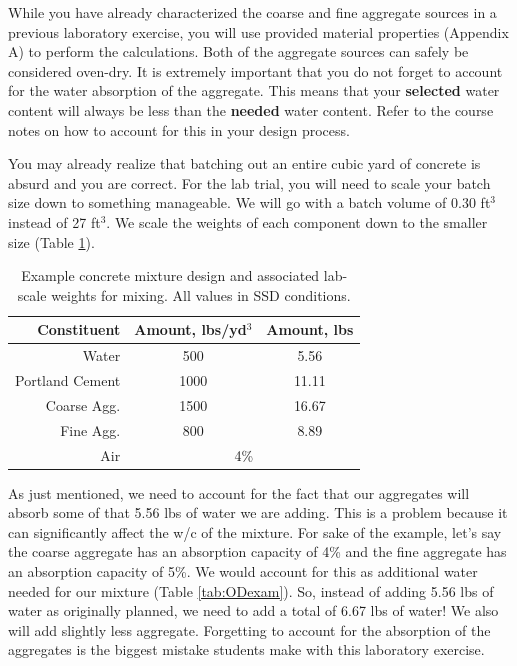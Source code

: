 \documentclass[12pt]{article}
\begin{document}
While you have already characterized the coarse and fine aggregate sources in a previous laboratory exercise, you will use provided material properties (Appendix A) to perform the calculations. Both of the aggregate sources can safely be considered oven-dry. It is extremely important that you do not forget to account for the water absorption of the aggregate. This means that your \textbf{selected} water content will always be less than the \textbf{needed} water content. Refer to the course notes on how to account for this in your design process.

You may already realize that batching out an entire cubic yard of concrete is absurd and you are correct. For the lab trial, you will need to scale your batch size down to something manageable. We will go with a batch volume of 0.30 ft$^3$ instead of 27 ft$^3$. We scale the weights of each component down to the smaller size (Table \ref{tab:SSDexam}).

\begin{table}[h]
\begin{center}
\caption{Example concrete mixture design and associated lab-scale weights for mixing. All values in SSD conditions.}
\label{tab:SSDexam}
\begin{tabular}{rcc}
\hline
Constituent     & \multicolumn{1}{l}{Amount, lbs/yd$^3$} & \multicolumn{1}{l}{Amount, lbs} \\ \hline
Water           & 500                                    & 5.56                            \\
Portland Cement & 1000                                   & 11.11                           \\
Coarse Agg.     & 1500                                   & 16.67                           \\
Fine Agg.       & 800                                    & 8.89                            \\
Air             & \multicolumn{2}{c}{4\%}                                                  \\ \hline
\end{tabular}
\end{center}
\end{table}

As just mentioned, we need to account for the fact that our aggregates will absorb some of that 5.56 lbs of water we are adding. This is a problem because it can significantly affect the w/c of the mixture. For sake of the example, let's say the coarse aggregate has an absorption capacity of 4\% and the fine aggregate has an absorption capacity of 5\%. We would account for this as additional water needed for our mixture (Table \ref{tab:ODexam}). So, instead of adding 5.56 lbs of water as originally planned, we need to add a total of 6.67 lbs of water! We also will add slightly less aggregate. Forgetting to account for the absorption of the aggregates is the biggest mistake students make with this laboratory exercise.
\end{document}
